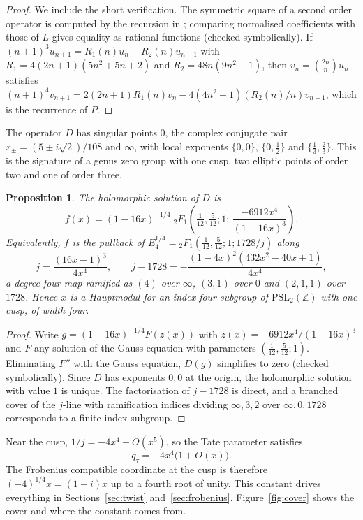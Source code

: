 \documentclass[11pt]{amsart}
\newtheorem{proposition}[theorem]{Proposition}
\theoremstyle{definition}
\theoremstyle{remark}
\newcommand{\Z}{\mathbb{Z}}
\begin{document}
\begin{proof}
We include the short verification. The symmetric square of a second order operator is computed by the recursion in
\cite[Lemma~4.2.4]{Bog12}; comparing normalised coefficients with those of $L$ gives equality as
rational functions (checked symbolically). If $(n+1)^3u_{n+1}=R_1(n)u_n-R_2(n)u_{n-1}$ with
$R_1=4(2n+1)(5n^2+5n+2)$ and $R_2=48n(9n^2-1)$, then $v_n=\binom{2n}{n}u_n$ satisfies
$(n+1)^4v_{n+1}=2(2n+1)R_1(n)v_n-4(4n^2-1)(R_2(n)/n)v_{n-1}$, which is the recurrence of $P$.
\end{proof}

The operator $D$ has singular points $0$, the complex conjugate pair
$x_\pm=(5\pm i\sqrt2)/108$ and $\infty$, with local exponents $\{0,0\}$, $\{0,\tfrac12\}$ and
$\{\tfrac13,\tfrac23\}$. This is the signature of a genus zero group with one cusp, two elliptic
points of order two and one of order three.

\begin{proposition}\label{prop:modular}
The holomorphic solution of $D$ is
\[
f(x)=(1-16x)^{-1/4}\;{}_2F_1\!\left(\tfrac1{12},\tfrac5{12};1;\,\frac{-6912x^4}{(1-16x)^3}\right).
\]
Equivalently, $f$ is the pullback of $E_4^{1/4}={}_2F_1(\tfrac1{12},\tfrac5{12};1;1728/j)$ along
\[
j=\frac{(16x-1)^3}{4x^4},\qquad j-1728=-\frac{(1-4x)^2(432x^2-40x+1)}{4x^4},
\]
a degree four map ramified as $(4)$ over $\infty$, $(3,1)$ over $0$ and $(2,1,1)$ over $1728$.
Hence $x$ is a Hauptmodul for an index four subgroup of $\mathrm{PSL}_2(\Z)$ with one cusp, of width four.
\end{proposition}

\begin{proof}
Write $g=(1-16x)^{-1/4}F(z(x))$ with $z(x)=-6912x^4/(1-16x)^3$ and $F$ any solution of the Gauss
equation with parameters $(\tfrac1{12},\tfrac5{12};1)$. Eliminating $F''$ with the Gauss equation,
$D(g)$ simplifies to zero (checked symbolically). Since $D$ has exponents $0,0$ at the origin, the
holomorphic solution with value $1$ is unique. The factorisation of $j-1728$ is direct, and a
branched cover of the $j$-line with ramification indices dividing $\infty,3,2$ over
$\infty,0,1728$ corresponds to a finite index subgroup.
\end{proof}

Near the cusp, $1/j=-4x^4+O(x^5)$, so the Tate parameter satisfies
\begin{equation}\label{eq:cusp}
q_\tau=-4x^4\bigl(1+O(x)\bigr).
\end{equation}
The Frobenius compatible coordinate at the cusp is therefore $(-4)^{1/4}x=(1+i)x$ up to a fourth
root of unity. This constant drives everything in Sections~\ref{sec:twist} and~\ref{sec:frobenius}.
Figure~\ref{fig:cover} shows the cover and where the constant comes from.
\end{document}
